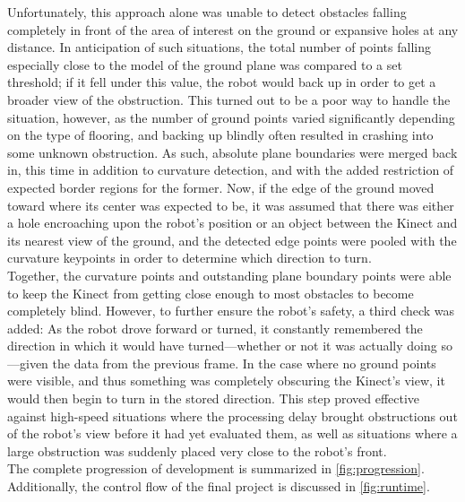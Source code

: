 \documentclass[12pt]{report}
\begin{document}
Unfortunately, this approach alone was unable to detect obstacles falling completely in front of the area of interest on the ground or expansive holes at any distance.  In anticipation of such situations, the total number of points falling especially close to the model of the ground plane was compared to a set threshold; if it fell under this value, the robot would back up in order to get a broader view of the obstruction.  This turned out to be a poor way to handle the situation, however, as the number of ground points varied significantly depending on the type of flooring, and backing up blindly often resulted in crashing into some unknown obstruction.  As such, absolute plane boundaries were merged back in, this time in addition to curvature detection, and with the added restriction of expected border regions for the former.  Now, if the edge of the ground moved toward where its center was expected to be, it was assumed that there was either a hole encroaching upon the robot's position or an object between the Kinect and its nearest view of the ground, and the detected edge points were pooled with the curvature keypoints in order to determine which direction to turn. \\
Together, the curvature points and outstanding plane boundary points were able to keep the Kinect from getting close enough to most obstacles to become completely blind.  However, to further ensure the robot's safety, a third check was added:  As the robot drove forward or turned, it constantly remembered the direction in which it would have turned---whether or not it was actually doing so---given the data from the previous frame.  In the case where no ground points were visible, and thus something was completely obscuring the Kinect's view, it would then begin to turn in the stored direction.  This step proved effective against high-speed situations where the processing delay brought obstructions out of the robot's view before it had yet evaluated them, as well as situations where a large obstruction was suddenly placed very close to the robot's front. \\
The complete progression of development is summarized in \autoref{fig:progression}.  Additionally, the control flow of the final project is discussed in \autoref{fig:runtime}. \\
\end{document}
